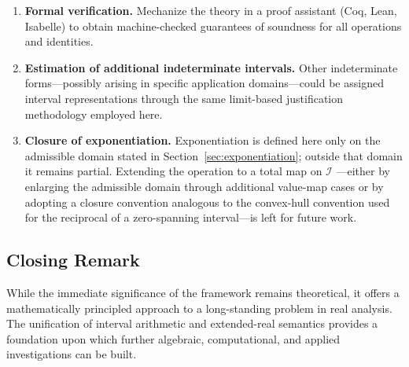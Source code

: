 \documentclass[11pt,a4paper]{article}
\theoremstyle{paperdef}
\newcommand{\Iset}{\mathcal{I}}
\begin{document}
\begin{enumerate}[leftmargin=2em]
  \item \textbf{Formal verification.} Mechanize the theory in a proof
    assistant (Coq, Lean, Isabelle) to obtain machine-checked
    guarantees of soundness for all operations and identities.

  \item \textbf{Estimation of additional indeterminate intervals.}
    Other indeterminate forms---possibly arising in specific
    application domains---could be assigned interval representations
    through the same limit-based justification methodology employed
    here.

  \item \textbf{Closure of exponentiation.} Exponentiation is defined
    here only on the admissible domain stated in
    Section~\ref{sec:exponentiation}; outside that domain it remains
    partial. Extending the operation to a total map on $\Iset$
    ---either by enlarging the admissible domain through additional
    value-map cases or by adopting a closure convention analogous to
    the convex-hull convention used for the reciprocal of a
    zero-spanning interval---is left for future work.
\end{enumerate}

\subsection{Closing Remark}

While the immediate significance of the framework remains
theoretical, it offers a mathematically principled approach to a
long-standing problem in real analysis. The unification of interval
arithmetic and extended-real semantics provides a foundation upon
which further algebraic, computational, and applied investigations
can be built.
\end{document}
